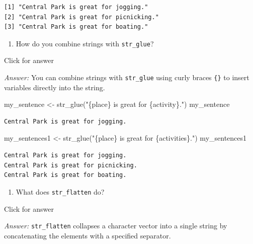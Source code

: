 \documentclass[
]{book}
\newenvironment{Shaded}{\begin{snugshade}}{\end{snugshade}}
\newcommand{\FunctionTok}[1]{\textcolor[rgb]{0.00,0.00,0.00}{#1}}
\newcommand{\NormalTok}[1]{#1}
\newcommand{\OtherTok}[1]{\textcolor[rgb]{0.56,0.35,0.01}{#1}}
\newcommand{\StringTok}[1]{\textcolor[rgb]{0.31,0.60,0.02}{#1}}
\providecommand{\tightlist}{%
  \setlength{\itemsep}{0pt}\setlength{\parskip}{0pt}}
\begin{document}
\begin{verbatim}
[1] "Central Park is great for jogging."   
[2] "Central Park is great for picnicking."
[3] "Central Park is great for boating."   
\end{verbatim}

\begin{enumerate}
\def\labelenumi{\alph{enumi}.}
\setcounter{enumi}{1}
\tightlist
\item
  How do you combine strings with \texttt{str\_glue}?
\end{enumerate}

Click for answer

\emph{Answer:} You can combine strings with \texttt{str\_glue} using curly braces \texttt{\{\}} to insert variables directly into the string.

\begin{Shaded}
\begin{Highlighting}[]
\NormalTok{my\_sentence }\OtherTok{\textless{}{-}} \FunctionTok{str\_glue}\NormalTok{(}\StringTok{"\{place\} is great for \{activity\}."}\NormalTok{)}
\NormalTok{my\_sentence}
\end{Highlighting}
\end{Shaded}

\begin{verbatim}
Central Park is great for jogging.
\end{verbatim}

\begin{Shaded}
\begin{Highlighting}[]
\NormalTok{my\_sentences1 }\OtherTok{\textless{}{-}} \FunctionTok{str\_glue}\NormalTok{(}\StringTok{"\{place\} is great for \{activities\}."}\NormalTok{)}
\NormalTok{my\_sentences1}
\end{Highlighting}
\end{Shaded}

\begin{verbatim}
Central Park is great for jogging.
Central Park is great for picnicking.
Central Park is great for boating.
\end{verbatim}

\begin{enumerate}
\def\labelenumi{\alph{enumi}.}
\setcounter{enumi}{2}
\tightlist
\item
  What does \texttt{str\_flatten} do?
\end{enumerate}

Click for answer

\emph{Answer:} \texttt{str\_flatten} collapses a character vector into a single string by concatenating the elements with a specified separator.
\end{document}
